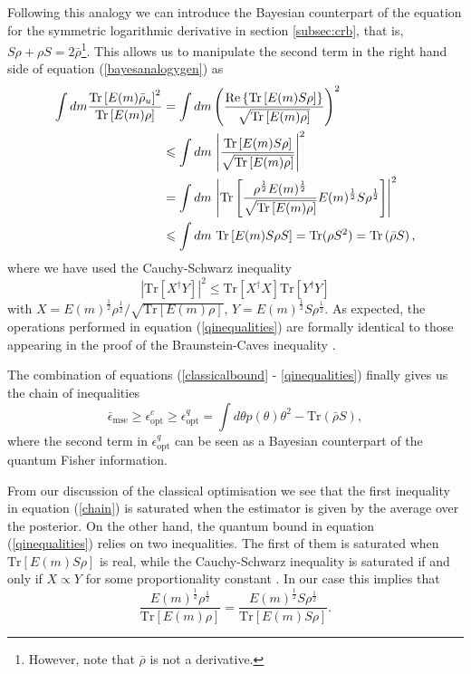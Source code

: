 Following this analogy we can introduce the Bayesian counterpart of the equation for the symmetric logarithmic derivative in section \ref{subsec:crb}, that is, $S \rho + \rho S = 2\bar{\rho}$\footnote{However, note that $\bar{\rho}$ is not a derivative.}. This allows us to manipulate the second term in the right hand side of equation (\ref{bayesanalogygen}) as 
\begin{align}
\int dm  \frac{\mathrm{Tr}\left[ E(m) \bar{\rho}_u \right]^2}{\mathrm{Tr}\left[ E(m) \rho \right]} &= \int dm\left(\frac{\mathrm{Re}\left\lbrace\mathrm{Tr}\left[E(m) S\rho\right]\right\rbrace}{\sqrt{\mathrm{Tr}\left[ E(m) \rho\right]}}\right)^2 
\nonumber \\
&\leqslant  \int dm~\abs{\frac{\mathrm{Tr}\left[E(m) S\rho\right]}{\sqrt{\mathrm{Tr}\left[ E(m) \rho\right]}}}^2
\nonumber \\
&=\int dm~ \abs{\mathrm{Tr}\left[\frac{\rho^{\frac{1}{2}}E(m)^{\frac{1}{2}}}{\sqrt{\mathrm{Tr}\left[ E(m) \rho \right]}} E(m)^{\frac{1}{2}}S \rho^{\frac{1}{2}}\right]}^2 
\nonumber \\
&\leqslant  \int dm~ \mathrm{Tr}\left[ E(m) S \rho S \right] = \mathrm{Tr}(\rho S^2) = \mathrm{Tr}\left(\bar{\rho} S \right) ,
\label{qinequalities}
\end{align}
where we have used the Cauchy-Schwarz inequality 
\begin{equation}
|\mathrm{Tr}[X^\dagger Y ]|^2 \leqslant \mathrm{Tr}[ X^\dagger X] \mathrm{Tr}[Y^\dagger Y]
\end{equation}
with $X = E(m)^{\frac{1}{2}} \rho^{\frac{1}{2}}/\sqrt{\mathrm{Tr}\left[ E(m) \rho \right]}$, $Y = E(m)^{\frac{1}{2}} S \rho^{\frac{1}{2}}$. As expected, the operations performed in equation (\ref{qinequalities}) are formally identical to those appearing in the proof of the Braunstein-Caves inequality \cite{BraunsteinCaves1994, genoni2008}. 

The combination of equations (\ref{classicalbound} - \ref{qinequalities}) finally gives us the chain of inequalities
\begin{equation}
\bar{\epsilon}_{\mathrm{mse}} \geqslant \epsilon_{\mathrm{opt}}^c \geqslant \epsilon_{\mathrm{opt}}^q = \int d\theta p(\theta) \theta^2 - \mathrm{Tr}(\bar{\rho} S),
\label{chain}
\end{equation}
where the second term in $\epsilon_{\mathrm{opt}}^q$ can be seen as a Bayesian counterpart of the quantum Fisher information. 

From our discussion of the classical optimisation we see that the first inequality in equation (\ref{chain}) is saturated when the estimator is given by the average over the posterior. On the other hand, the quantum bound in equation (\ref{qinequalities}) relies on two inequalities. The first of them is saturated when $\mathrm{Tr}[E(m)S\rho]$ is real, while the Cauchy-Schwarz inequality is saturated if and only if $X \propto Y$ for some proportionality constant \cite{helstrom1968multiparameter}. In our case this implies that
\begin{equation}
\frac{E(m)^{\frac{1}{2}}\rho^{\frac{1}{2}}}{\mathrm{Tr}\left[E(m) \rho \right]} = \frac{E(m)^{\frac{1}{2}}S\rho^{\frac{1}{2}}}{\mathrm{Tr}\left[E(m) S \rho \right]}.
\end{equation}

